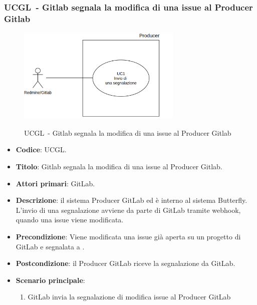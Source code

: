 	
	\subsubsection{UCGL\theuccount\ - Gitlab segnala la modifica di una issue al Producer Gitlab}
	\begin{figure}[H]
		\centering
		\includegraphics[width=0.7\textwidth]{img/UC1.png}\\
		\caption{UCGL\theuccount\ - Gitlab segnala la modifica di una issue al Producer Gitlab}
	\end{figure}
	\begin{itemize}
		\item \textbf{Codice}: UCGL\theuccount.
		\item \textbf{Titolo}: Gitlab segnala la modifica di una issue al Producer Gitlab.
		\item \textbf{Attori primari}: GitLab.
		\item \textbf{Descrizione}:
		il sistema Producer GitLab ed è interno al sistema Butterfly. L'invio di una segnalazione avviene da parte di GitLab tramite webhook, quando una issue viene modificata.
		\item \textbf{Precondizione}: Viene modificata una issue già aperta su un
		progetto di GitLab e segnalata a \progetto.
		\item \textbf{Postcondizione}: il Producer GitLab riceve la segnalazione da GitLab.
		\item \textbf{Scenario principale}: 
		\begin{enumerate}
			\item GitLab invia la segnalazione di modifica issue al Producer GitLab
		\end{enumerate}
		
	\end{itemize}
	
	
